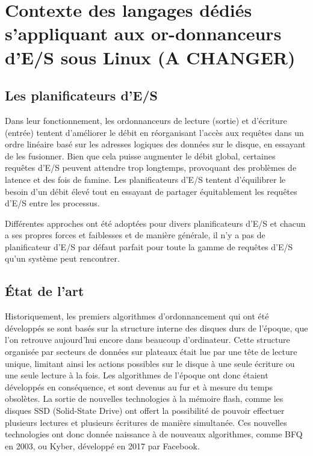 \section[Contexte des langages dédiés s'appliquant aux ordonnanceurs d'E/S sous Linux (A CHANGER)]{Contexte des langages dédiés s'appliquant aux or-donnanceurs d'E/S sous Linux (A CHANGER)}
\label{context}

\subsection{Les planificateurs d'E/S}

Dans leur fonctionnement, les ordonnanceurs de lecture (sortie) et d'écriture 
(entrée) tentent d'améliorer le débit en réorganisant l'accès aux requêtes dans 
un ordre linéaire basé sur les adresses logiques des données sur le disque, en 
essayant de les fusionner. Bien que cela puisse augmenter le débit global, 
certaines requêtes d'E/S peuvent attendre trop longtemps, provoquant des 
problèmes de latence et des fois de famine. Les planificateurs d'E/S tentent 
d'équilibrer le besoin d'un débit élevé tout en essayant de partager 
équitablement les requêtes d'E/S entre les processus.

Différentes approches ont été adoptées pour divers planificateurs d'E/S et 
chacun a ses propres forces et faiblesses et de manière générale, il n'y a pas 
de planificateur d'E/S par défaut parfait pour toute la gamme de requêtes d'E/S 
qu'un système peut rencontrer. 

\subsection{État de l'art}

Historiquement, les premiers algorithmes d'ordonnancement qui ont été 
développés se sont basés sur la structure interne des disques durs de l'époque, 
que l'on retrouve aujourd'hui encore dans beaucoup d'ordinateur. Cette 
structure organisée par secteurs de données sur plateaux était lue par une tête 
de lecture unique, limitant ainsi les actions possibles sur le disque à une 
seule écriture ou une seule lecture à la fois. Les algorithmes de l'époque ont 
donc étaient développés en conséquence, et sont devenus au fur et à mesure du 
temps obsolètes. La sortie de nouvelles technologies à la mémoire flash, comme 
les disques SSD (Solid-State Drive) ont offert la possibilité de pouvoir 
effectuer plusieurs lectures et plusieurs écritures de manière simultanée. Ces 
nouvelles technologies ont donc donnée naissance à de nouveaux algorithmes, 
comme BFQ en 2003, ou Kyber, développé en 2017 par Facebook.


